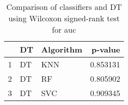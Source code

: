 \begin{table}
\footnotesize
\caption{Comparison of classifiers and DT using Wilcoxon signed-rank test for auc}
\label{tab:DT wilcoxon AUC comparison}
\begin{tabular}{lllr}
\hline
 & DT & Algorithm & p-value \\
\hline
1 & DT & KNN & 0.853131 \\
2 & DT & RF & 0.805902 \\
3 & DT & SVC & 0.909345 \\
\hline
\end{tabular}
\end{table}
